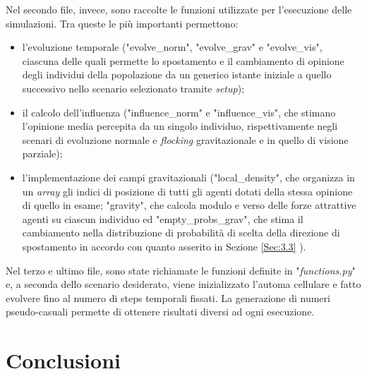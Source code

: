 \documentclass[letterpaper,10pt]{article}
\begin{document}
Nel secondo file, invece, sono raccolte le funzioni utilizzate per l'esecuzione delle simulazioni. Tra queste le più importanti permettono:

\begin{itemize}
  \item l'evoluzione temporale ("evolve\_norm", "evolve\_grav" e "evolve\_vis", ciascuna delle quali permette lo spostamento e il cambiamento di opinione degli individui della popolazione da un generico istante iniziale a quello successivo nello scenario selezionato tramite \textit{setup});
  \item il calcolo dell'influenza ("influence\_norm" e "influence\_vis", che stimano l'opinione media percepita da un singolo individuo, rispettivamente negli scenari di evoluzione normale e \textit{flocking} gravitazionale e in quello di visione parziale);
  \item l'implementazione dei campi gravitazionali ("local\_density", che organizza in un \textit{array} gli indici di posizione di tutti gli agenti dotati della stessa opinione di quello in esame; "gravity", che calcola modulo e verso delle forze attrattive agenti su ciascun individuo ed "empty\_probs\_grav", che stima il cambiamento nella distribuzione di probabilità di scelta della direzione di spostamento in accordo con quanto asserito in Sezione \ref{Sec:3.3} ).
\end{itemize}

Nel terzo e ultimo file, sono state richiamate le funzioni definite in "\textit{functions.py}" e, a seconda dello scenario desiderato, viene inizializzato l'automa cellulare e fatto evolvere fino al numero di steps temporali fissati. La generazione di numeri pseudo-casuali permette di ottenere risultati diversi ad ogni esecuzione. 

\section{Conclusioni}
\end{document}
